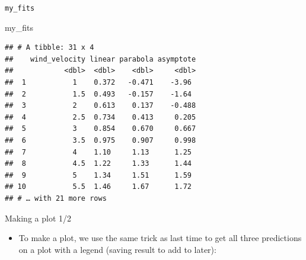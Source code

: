 \documentclass[ignorenonframetext,]{beamer}
\newenvironment{Shaded}{\begin{snugshade}}{\end{snugshade}}
\newcommand{\DataTypeTok}[1]{\textcolor[rgb]{0.13,0.29,0.53}{#1}}
\newcommand{\KeywordTok}[1]{\textcolor[rgb]{0.13,0.29,0.53}{\textbf{#1}}}
\newcommand{\NormalTok}[1]{#1}
\newcommand{\OperatorTok}[1]{\textcolor[rgb]{0.81,0.36,0.00}{\textbf{#1}}}
\newcommand{\StringTok}[1]{\textcolor[rgb]{0.31,0.60,0.02}{#1}}
\providecommand{\tightlist}{%
  \setlength{\itemsep}{0pt}\setlength{\parskip}{0pt}}
\begin{document}
\begin{frame}[fragile]{\texttt{my\_fits}}
\protect\hypertarget{my_fits}{}

\begin{Shaded}
\begin{Highlighting}[]
\NormalTok{my_fits}
\end{Highlighting}
\end{Shaded}

\begin{verbatim}
## # A tibble: 31 x 4
##    wind_velocity linear parabola asymptote
##            <dbl>  <dbl>    <dbl>     <dbl>
##  1           1    0.372   -0.471    -3.96 
##  2           1.5  0.493   -0.157    -1.64 
##  3           2    0.613    0.137    -0.488
##  4           2.5  0.734    0.413     0.205
##  5           3    0.854    0.670     0.667
##  6           3.5  0.975    0.907     0.998
##  7           4    1.10     1.13      1.25 
##  8           4.5  1.22     1.33      1.44 
##  9           5    1.34     1.51      1.59 
## 10           5.5  1.46     1.67      1.72 
## # … with 21 more rows
\end{verbatim}

\end{frame}

\begin{frame}[fragile]{Making a plot 1/2}
\protect\hypertarget{making-a-plot-12}{}

\begin{itemize}
\tightlist
\item
  To make a plot, we use the same trick as last time to get all three
  predictions on a plot with a legend (saving result to add to later):
\end{itemize}

\begin{Shaded}
\end{Shaded}

\end{frame}
\end{document}
